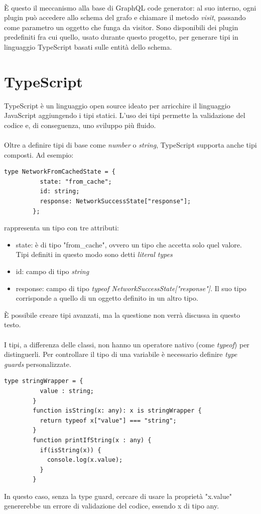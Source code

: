 \documentclass[a4paper, 12pt]{report}
\begin{document}
      \paragraph*{}È questo il meccanismo alla base di GraphQL code generator: al suo interno, ogni plugin può accedere allo schema del grafo e chiamare il metodo \emph{visit}, passando come parametro un oggetto che funga da visitor.
        Sono disponibili dei plugin predefiniti fra cui quello, usato durante questo progetto, per generare tipi in linguaggio TypeScript basati sulle entità dello schema.
    \section{TypeScript}
      TypeScript è un linguaggio open source ideato per arricchire il linguaggio JavaScript aggiungendo i tipi statici.
      L'uso dei tipi permette la validazione del codice e, di conseguenza, uno sviluppo più fluido.
      \paragraph*{}
      Oltre a definire tipi di base come \emph{number} o \emph{string}, TypeScript supporta anche tipi composti. Ad esempio:
      \begin{Verbatim}[samepage=true]
        type NetworkFromCachedState = {
          state: "from_cache";
          id: string;
          response: NetworkSuccessState["response"];
        };
      \end{Verbatim}
      rappresenta un tipo con tre attributi:
      \begin{itemize}
        \item state: è di tipo "from_cache", ovvero un tipo che accetta solo quel valore. Tipi definiti in questo modo sono detti \emph{literal types}
        \item id: campo di tipo \emph{string}
        \item response: campo di tipo \emph{typeof NetworkSuccessState["response"]}. Il suo tipo corrisponde a quello di un oggetto definito in un altro tipo.
      \end{itemize}
      È possibile creare tipi avanzati, ma la questione non verrà discussa in questo testo.
      \paragraph*{}
      I tipi, a differenza delle classi, non hanno un operatore nativo (come \emph{typeof}) per distinguerli.
      Per controllare il tipo di una variabile è necessario definire \emph{type guards} personalizzate.
      \begin{Verbatim}[samepage=true]
        type stringWrapper = {
          value : string;
        }
        function isString(x: any): x is stringWrapper {
          return typeof x["value"] === "string";
        }
        function printIfString(x : any) {
          if(isString(x)) {
            console.log(x.value);
          }
        }
      \end{Verbatim}
      In questo caso, senza la type guard, cercare di usare la proprietà "x.value" genererebbe un errore di validazione del codice, essendo x di tipo any.
\end{document}
